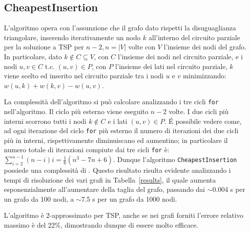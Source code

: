 \subsection{CheapestInsertion}

L'algoritmo opera con l'assunzione che il grafo dato rispetti la disuguaglianza triangolare, inserendo iterativamente un nodo $k$ all'interno del circuito parziale per la soluzione a TSP per $n-2, n=|V|$ volte con $V$ l'insieme dei nodi del grafo. In particolare, dato $k \notin C \subseteq V$, con $C$ l'insieme dei nodi nel circuito parziale, e i nodi $u,v \in C$ \mbox{t.c.} $(u,v)\in P$, con $P$ l'insieme dei lati nel circuito parziale, $k$ viene scelto ed inserito nel circuito parziale tra i nodi $u$ e $v$ minimizzando: $w(u,k)+w(k,v)-w(u,v)$.

La complessità dell'algoritmo si può calcolare analizzando i tre cicli \texttt{for} nell'algoritmo. Il ciclo più esterno viene eseguito $n-2$ volte. I due cicli più interni scorrono tutti i nodi $k \notin C$ e i lati $(u,v)\in P$. \'E possibile vedere come, ad ogni iterazione del ciclo \texttt{for} più esterno il numero di iterazioni dei due cicli più in interni, rispettivamente diminuiscano ed aumentino; in particolare il numero totale di iterazioni compiute dai tre cicli \texttt{for} è: $\sum_{i=2}^{n-1} (n-i)i=\frac{1}{6}(n^3-7n+6)$. Dunque l'algoritmo \texttt{CheapestInsertion} possiede una complessità di .
Questo risultato risulta evidente analizzando i tempi di risoluzione dei vari grafi in Tabella~\ref{results}, il quale aumenta esponenzialmente all'aumentare della taglia del grafo, passando dai $\sim$0.004 s per un grafo da 100 nodi, a $\sim$7.5 s per un grafo da 1000 nodi.

L'algoritmo è 2-approssimato per TSP, anche se nei grafi forniti l'errore relativo massimo è del 22\%, dimostrando dunque di essere molto efficace.

